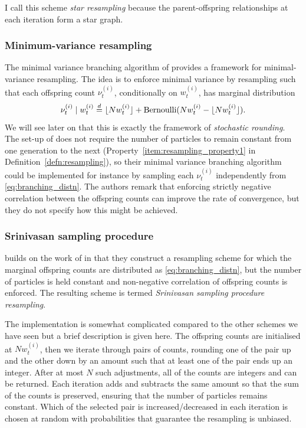 I call this scheme \emph{star resampling} because the parent-offspring relationships at each iteration form a star graph.


\subsubsection{Minimum-variance resampling}
The minimal variance branching algorithm of \textcite{crisan1999} provides a framework for minimal-variance resampling. The idea is to enforce minimal variance by resampling such that each offspring count $\nu_t^{(i)}$, conditionally on $w_t^{(i)}$, has marginal distribution
\begin{equation}\label{eq:branching_distn}
\nu_t^{(i)} \mid w_t^{(i)} \overset{d}{=} \lfloor N w_t^{(i)} \rfloor + \operatorname{Bernoulli}(Nw_t^{(i)} - \lfloor N w_t^{(i)} \rfloor) .
\end{equation}
We will see later on that this is exactly the framework of \emph{stochastic rounding}.
The set-up of \textcite{crisan1999} does not require the number of particles to remain constant from one generation to the next (Property~\ref{item:resampling_property1} in Definition~\ref{defn:resampling}), so their minimal variance branching algorithm could be implemented for instance by sampling each $\nu_t^{(i)}$ independently from \eqref{eq:branching_distn}. The authors remark that enforcing strictly negative correlation between the offspring counts can improve the rate of convergence, but they do not specify how this might be achieved.



\subsubsection{Srinivasan sampling procedure}
\textcite{gerber2017} builds on the work of \textcite{crisan1999} in that they construct a resampling scheme for which the marginal offspring counts are distributed as \eqref{eq:branching_distn}, but the number of particles is held constant and non-negative correlation of offspring counts is enforced. The resulting scheme is termed \emph{Srinivasan sampling procedure resampling}.

The implementation is somewhat complicated compared to the other schemes we have seen \parencite[for full details see][Algorithm~1]{gerber2017} but a brief description is given here.
The offspring counts are initialised at $Nw_t^{(i)}$, then we iterate through pairs of counts, rounding one of the pair up and the other down by an amount such that at least one of the pair ends up an integer. After at most $N$ such adjustments, all of the counts are integers and can be returned. Each iteration adds and subtracts the same amount so that the sum of the counts is preserved, ensuring that the number of particles remains constant. Which of the selected pair is increased/decreased in each iteration is chosen at random with probabilities that guarantee the resampling is unbiased.

